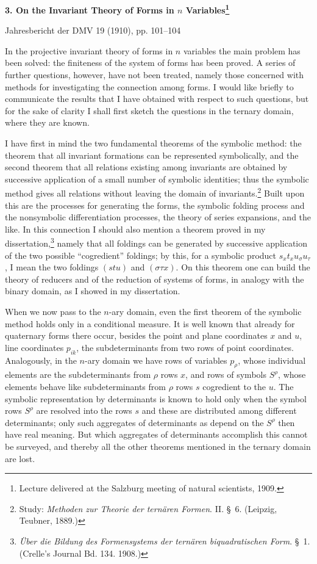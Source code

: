 \documentclass[11pt]{article}
\begin{document}
\begin{center}
{\Large\bfseries 3. On the Invariant Theory of Forms in $n$ Variables\footnote{Lecture delivered at the Salzburg meeting of natural scientists, 1909.}}\par
\vspace{1.2em}
Jahresbericht der DMV 19 (1910), pp. 101--104
\end{center}

\vspace{1em}
In the projective invariant theory of forms in $n$ variables the main problem has been solved: the finiteness of the system of forms has been proved. A series of further questions, however, have not been treated, namely those concerned with methods for investigating the connection among forms. I would like briefly to communicate the results that I have obtained with respect to such questions, but for the sake of clarity I shall first sketch the questions in the ternary domain, where they are known.

I have first in mind the two fundamental theorems of the symbolic method: the theorem that all invariant formations can be represented symbolically, and the second theorem that all relations existing among invariants are obtained by successive application of a small number of symbolic identities; thus the symbolic method gives all relations without leaving the domain of invariants.\footnote{Study: \emph{Methoden zur Theorie der ternären Formen}. II. \S\ 6. (Leipzig, Teubner, 1889.)} Built upon this are the processes for generating the forms, the symbolic folding process and the nonsymbolic differentiation processes, the theory of series expansions, and the like. In this connection I should also mention a theorem proved in my dissertation,\footnote{\emph{Über die Bildung des Formensystems der ternären biquadratischen Form}. \S\ 1. (Crelle's Journal Bd. 134. 1908.)} namely that all foldings can be generated by successive application of the two possible ``cogredient'' foldings; by this, for a symbolic product $s_x t_x u_\sigma u_\tau$, I mean the two foldings $(stu)$ and $(\sigma\tau x)$. On this theorem one can build the theory of reducers and of the reduction of systems of forms, in analogy with the binary domain, as I showed in my dissertation.

When we now pass to the $n$-ary domain, even the first theorem of the symbolic method holds only in a conditional measure. It is well known that already for quaternary forms there occur, besides the point and plane coordinates $x$ and $u$, line coordinates $p_{ik}$, the subdeterminants from two rows of point coordinates. Analogously, in the $n$-ary domain we have rows of variables $p_\rho$, whose individual elements are the subdeterminants from $\rho$ rows $x$, and rows of symbols $S^\rho$, whose elements behave like subdeterminants from $\rho$ rows $s$ cogredient to the $u$. The symbolic representation by determinants is known to hold only when the symbol rows $S^\rho$ are resolved into the rows $s$ and these are distributed among different determinants; only such aggregates of determinants as depend on the $S^\rho$ then have real meaning. But which aggregates of determinants accomplish this cannot be surveyed, and thereby all the other theorems mentioned in the ternary domain are lost.
\end{document}
